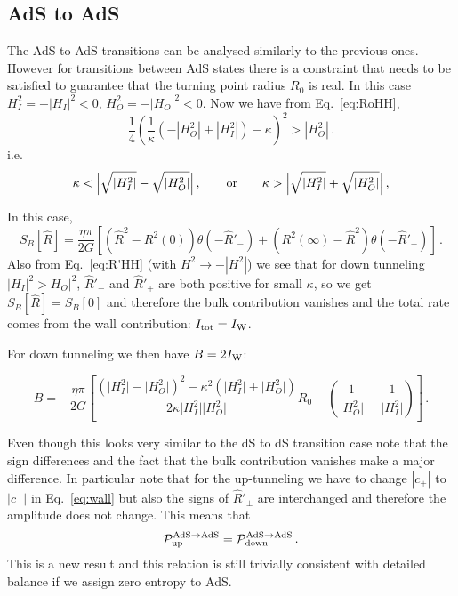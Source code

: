 \documentclass[a4paper,11pt]{article}
\numberwithin{equation}{section}
\newcommand{\be}{\begin{equation}}
\newcommand{\ee}{\end{equation}}
\numberwithin{equation}{section}
\begin{document}
\subsection{AdS to AdS}



The AdS to AdS transitions can be analysed similarly to the previous ones.
However for transitions between AdS states there is a constraint that needs to be satisfied to guarantee that the turning point radius $R_0$ is real.
In this case $H_{I}^{2}=-|H_{I}|^{2}<0,\,H_{O}^{2}=-|H_{O}|^{2}<0$.
Now we have from Eq.~\eqref{eq:RoHH},
\[
\frac{1}{4}\left(\frac{1}{\kappa}\left(-|H_{O}^{2}|+|H_{I}^{2}|\right)-\kappa\right)^{2}>|H_{O}^{2}| \,.
\]
i.e.
\be
\kappa < \Big |\sqrt{|H_{I}^{2}|}-\sqrt{|H_{O}^{2}|}\Big | \,,\qquad {\rm or}\qquad \kappa > \Big |\sqrt{|H_{I}^{2}|}+\sqrt{|H_{O}^{2}|}\Big | \,,\label{eq:kappaconstraint}
\ee


In this case,
\be
S_B[\hat R]=\frac{\eta \pi}{2G}\left[ \left(\hat R^2-R^2(0)\right) \theta (-\hat R'_-)+\left(R^2(\infty)-\hat R^2 \right) \theta (-\hat R'_+)  \right] \,.
\ee
Also from Eq.~\eqref{eq:R'HH}  (with $H^2\rightarrow -|H^2|$) we see that for down tunneling $|H_I|^2>H_O|^2$, $\hat R'_-$ and $\hat R'_+$ are both positive for small $\kappa$, so we get $ S_B[\hat R]=S_B[0]$ and therefore the bulk contribution vanishes and the total rate comes from the wall contribution:
$I_{\rm tot}=I_{\rm W}$.

For down tunneling we then have $B=2I_{\rm W}$:

\be
\boxed{B=-\frac{\eta \pi}{2G}\left[ \frac{\left(\big |H_I^2 \big |-\big |H_O^2 \big |\right)^2-\kappa^2 \left (\big |H_I^2 \big |+\big |H_O^2 \big |\right)}{2\kappa \big |H_I^2 \big |\big |H_O^2 \big |}R_0-\left(\frac{1}{\big |H_O^2 \big |}-\frac{1}{\big |H_I^2 \big |}\right)\right]} \,.
\ee

Even though this looks very similar to the dS to dS transition case note that the sign differences and the fact that the bulk contribution vanishes make a major difference. In particular note that 
for the up-tunneling we have to change $|c_+|$ to $|c_-|$ in Eq.~\eqref{eq:wall} but also the signs of $\hat R'_\pm$ are interchanged and therefore the amplitude does not change. This means that 
\be
{\mathcal P}_{\rm up}^{{\rm AdS}\rightarrow {\rm AdS}}={\mathcal P}_{\rm down}^{{\rm AdS}\rightarrow {\rm AdS}}\,.
\ee
This is a new result and this  relation is still trivially  consistent with detailed balance if we assign zero entropy to AdS.

\end{document}
